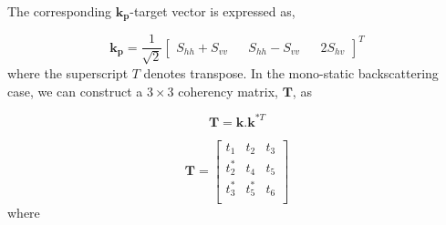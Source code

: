 
 
 





The corresponding $\bm{k_p}$-target vector is expressed as,

\begin{equation}
\bm{k_p} = \frac{1}{\sqrt{2}} \begin{bmatrix}  S_{hh}+S_{vv} && S_{hh}-S_{vv} && 2S_{hv} \end{bmatrix} ^T
\end{equation}
where the superscript $T$ denotes transpose. In the mono-static backscattering case, we can construct a $3\times3$ coherency matrix, $\mathbf{T}$, as

\begin{equation}
	\mathbf{T} =  \bm{k} . \bm{k}^{*T} 
\end{equation}


\begin{equation}
\mathbf{T} =  \begin{bmatrix}
t_1 & t_2 & t_3 \\
t_2^* & t_4 & t_5 \\
t_3^* & t_5^* & t_6 \\
\end{bmatrix} 
\end{equation}
where

